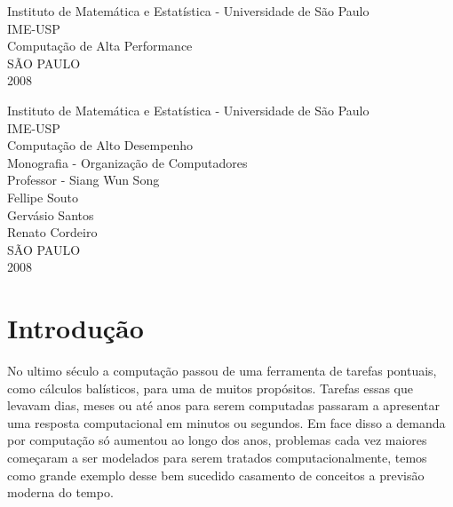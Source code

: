 \documentclass[a4paper]{article}
\begin{document}
\begin{titlepage}
    \begin{center}
        {\large Instituto de Matemática e Estatística - Universidade de São Paulo} \\
        {\large IME-USP} \\[4.9cm]
        {\Huge Computação de Alta Performance} \\[9.9cm]
        \vfill
        {\large SÃO PAULO} \\
        {\large 2008}
    \end{center}
\end{titlepage}

\newpage

\begin{titlepage}
    \begin{center}
        {\large Instituto de Matemática e Estatística - Universidade de São Paulo} \\
        {\large IME-USP} \\[4.9cm]
        {\Huge Computação de Alto Desempenho} \\[4.9cm]
        {\large Monografia - Organização de Computadores } \\
        {\large Professor - Siang Wun Song } \\[2.9cm]
        {\large Fellipe Souto \\
                Gervásio Santos \\ 
                Renato Cordeiro} \\[2.9cm]
        \vfill
        {\large SÃO PAULO} \\
        {\large 2008}
    \end{center}
\end{titlepage}

\tableofcontents

\newpage

\section{Introdução}

No ultimo século a computação passou de uma ferramenta de tarefas pontuais, como cálculos balísticos, para uma de muitos propósitos. Tarefas essas que levavam dias, meses ou até anos para serem computadas passaram a apresentar uma resposta computacional em minutos ou segundos. Em face disso a demanda por computação só aumentou ao longo dos anos,  problemas cada vez maiores começaram a ser modelados para serem tratados computacionalmente, temos como grande exemplo desse bem sucedido casamento de conceitos a previsão moderna do tempo.
\end{document}
